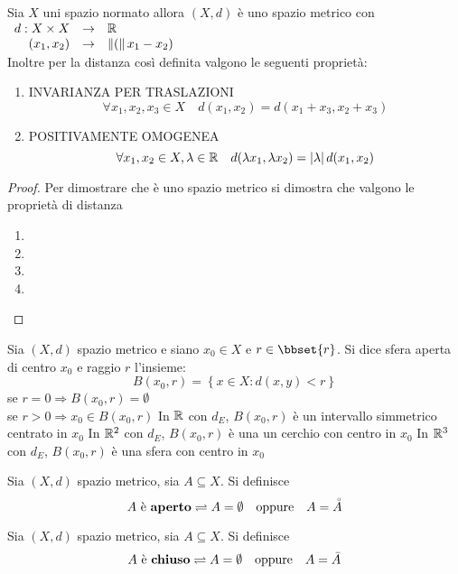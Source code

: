 \proposition
Sia $X$ uni spazio normato allora $(X,d)$ è uno spazio metrico con $\begin{array}{rcl} d : X\times X & \to & \mathbb{R} \\ (x_1,x_2) & \to & \left\|(\right\|x_1-x_2) \end{array}$\\
Inoltre per la distanza così definita valgono le seguenti proprietà:
\begin{enumerate}
	\item INVARIANZA PER TRASLAZIONI
	$$\forall x_1,x_2,x_3\in X \quad d(x_1,x_2)=d(x_1+x_3,x_2+x_3)$$
	\item POSITIVAMENTE OMOGENEA
	$$ \forall x_1,x_2\in X, \lambda\in\mathbb{R}\quad d(\lambda x_1,\lambda x_2)=\left|\lambda\right|d(x_1,x_2)$$
\end{enumerate}
\begin{proof}
	Per dimostrare che è uno spazio metrico si dimostra che valgono le proprietà di distanza
	\begin{enumerate}
		\item
		\item
		\item
		\item
	\end{enumerate}
\end{proof}

Sia $(X,d)$ spazio metrico e siano $x_0\in X$ e $r\in\bbset{r}$. Si dice sfera aperta di centro $x_0$ e raggio $r$ l'insieme:
$$B(x_0,r)=\left\{ x\in X : d(x,y)<r  \right\}$$
\observation
se $r=0\Rightarrow B(x_0,r)=\emptyset$\\
se $r>0\Rightarrow x_0\in B(x_0,r)$
\example
In $\mathbb{R}$ con $d_E$, $B(x_0,r)$ è un intervallo simmetrico centrato in $x_0$
\example
In $\mathbb{R}^{2}$ con $d_E$, $B(x_0,r)$ è una un cerchio con centro in $x_0$
\example
In $\mathbb{R}^{3}$ con $d_E$, $B(x_0,r)$ è una sfera con centro in $x_0$
\example

\begin{definition}
	\label{def:aperto}
	Sia $(X,d)$ spazio metrico, sia $A\subseteq X$. Si definisce
	$$A\text{ è \textbf{aperto}}\rightleftharpoons A=\emptyset\quad\text{oppure}\quad A=\accentset{\circ}{A}$$
\end{definition}

\begin{definition}
	\label{def:chiuso}
	Sia $(X,d)$ spazio metrico, sia $A\subseteq X$. Si definisce
	$$A\text{ è \textbf{chiuso}}\rightleftharpoons A=\emptyset\quad\text{oppure}\quad A=\bar{A}$$
\end{definition}

